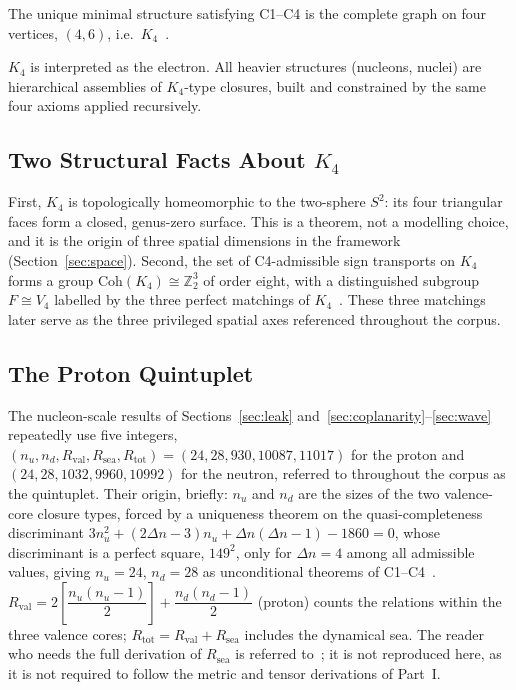 \documentclass[11pt,a4paper]{article}
\newcommand{\Kfour}{K_4}
\newcommand{\Rtot}{R_{\mathrm{tot}}}
\newcommand{\Rval}{R_{\mathrm{val}}}
\newcommand{\Rsea}{R_{\mathrm{sea}}}
\begin{document}
\begin{theorembox}
The unique minimal structure satisfying C1--C4 is the complete graph on four vertices, $(4,6)$, i.e.\ $\Kfour$~\citep{D01}.
\end{theorembox}

$\Kfour$ is interpreted as the electron. All heavier structures (nucleons, nuclei) are hierarchical assemblies of $\Kfour$-type closures, built and constrained by the same four axioms applied recursively.

\subsection{Two Structural Facts About \texorpdfstring{$K_4$}{K4}}

First, $\Kfour$ is topologically homeomorphic to the two-sphere $S^2$: its four triangular faces form a closed, genus-zero surface. This is a theorem, not a modelling choice, and it is the origin of three spatial dimensions in the framework (Section~\ref{sec:space}). Second, the set of C4-admissible sign transports on $\Kfour$ forms a group $\mathrm{Coh}(\Kfour)\cong\mathbb{Z}_2^3$ of order eight, with a distinguished subgroup $F\cong V_4$ labelled by the three perfect matchings of $\Kfour$~\citep{D61}. These three matchings later serve as the three privileged spatial axes referenced throughout the corpus.

\subsection{The Proton Quintuplet}
\label{sec:quintuplet}

The nucleon-scale results of Sections~\ref{sec:leak} and~\ref{sec:coplanarity}--\ref{sec:wave} repeatedly use five integers, $(n_u,n_d,\Rval,\Rsea,\Rtot)=(24,28,930,10087,11017)$ for the proton and $(24,28,1032,9960,10992)$ for the neutron, referred to throughout the corpus as the quintuplet. Their origin, briefly: $n_u$ and $n_d$ are the sizes of the two valence-core closure types, forced by a uniqueness theorem on the quasi-completeness discriminant $3n_u^2+(2\Delta n-3)n_u+\Delta n(\Delta n-1)-1860=0$, whose discriminant is a perfect square, $149^2$, only for $\Delta n=4$ among all admissible values, giving $n_u=24$, $n_d=28$ as unconditional theorems of C1--C4~\citep{D47}. $\Rval=2\left[\dfrac{n_u(n_u-1)}{2}\right]+\dfrac{n_d(n_d-1)}{2}$ (proton) counts the relations within the three valence cores; $\Rtot=\Rval+\Rsea$ includes the dynamical sea. The reader who needs the full derivation of $\Rsea$ is referred to~\citep{D47}; it is not reproduced here, as it is not required to follow the metric and tensor derivations of Part~I.
\end{document}
